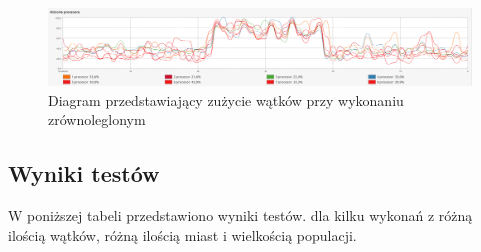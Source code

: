 \documentclass[10pt,a4paper]{article}
\begin{document}
\begin{figure}[H]
\includegraphics[scale=0.18]{zrzutParallel.png}
\centering
\caption{\label{diagramParallel}Diagram przedstawiający zużycie wątków przy wykonaniu zrównoleglonym}
\end{figure}

\subsection{Wyniki testów\label{sec:wt}}
W poniższej tabeli przedstawiono wyniki testów. dla kilku wykonań z różną ilością wątków, różną ilością miast i wielkością populacji.


\end{document}
